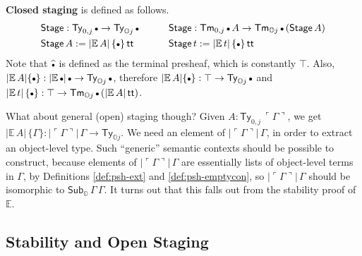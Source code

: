 \documentclass[acmsmall]{acmart}
\newcommand{\msf}[1]{\mathsf{#1}}
\newcommand{\mbb}[1]{\mathbb{#1}}
\newcommand{\wh}[1]{\widehat{#1}}
\newcommand{\mbbo}{\mbb{O}}
\newcommand{\Ty}{\msf{Ty}}
\newcommand{\Tm}{\msf{Tm}}
\newcommand{\Subo}{\msf{Sub}_{\mbbo}}
\renewcommand{\tt}{\msf{tt}}
\newcommand{\emptycon}{\scaleobj{.75}\bullet}
\newcommand{\emb}[1]{\ulcorner#1\urcorner}
\newcommand{\Stage}{\msf{Stage}}
\newcommand{\ev}{\mbb{E}}
\theoremstyle{remark}
\begin{document}
\begin{definition} \textbf{Closed staging} is defined as follows.
\begin{alignat*}{4}
  & \Stage : \Ty_{0,j}\,\emptycon \to \Ty_{\mbbo j}\,\emptycon \hspace{2em} && \Stage : \Tm_{0,j}\,\emptycon\,A \to \Tm_{\mbbo j}\,\emptycon\,(\Stage\,A) \\
  & \Stage\,A := |\ev\,A|\,\{\emptycon\}\,\tt && \Stage\,t := |\ev\,t|\,\{\emptycon\}\,\tt
\end{alignat*}
Note that $\wh{\emptycon}$ is defined as the terminal presheaf, which is
constantly $\top$. Also, $|\ev\,A|\{\emptycon\} : |\ev\,\emptycon|\,\emptycon \to \Ty_{\mbbo
  j}\,\emptycon$, therefore $|\ev\,A|\{\emptycon\} : \top \to \Ty_{\mbbo
  j}\,\emptycon$ and $|\ev\,t|\,\{\emptycon\} : \top \to \Tm_{\mbbo
  j}\,\emptycon\,(|\ev\,A|\,\tt)$.
\end{definition}

What about general (open) staging though? Given $A : \Ty_{0,j}\,\emb{\Gamma}$,
we get $|\ev\,A|\,\{\Gamma\} : |\emb{\Gamma}|\,\Gamma \to \Ty_{\mbbo j}$. We
need an element of $|\emb{\Gamma}|\,\Gamma$, in order to extract an object-level
type. Such ``generic'' semantic contexts should be possible to construct, because
elements of $|\emb{\Gamma}|\,\Gamma$ are essentially lists of object-level terms
in $\Gamma$, by Definitions \ref{def:psh-ext} and \ref{def:psh-emptycon}, so $|\emb{\Gamma}|\,\Gamma$ should be
isomorphic to $\Subo\,\Gamma\,\Gamma$.  It turns out that this falls out from
the stability proof of $\ev$.


\subsection{Stability and Open Staging}
\end{document}

